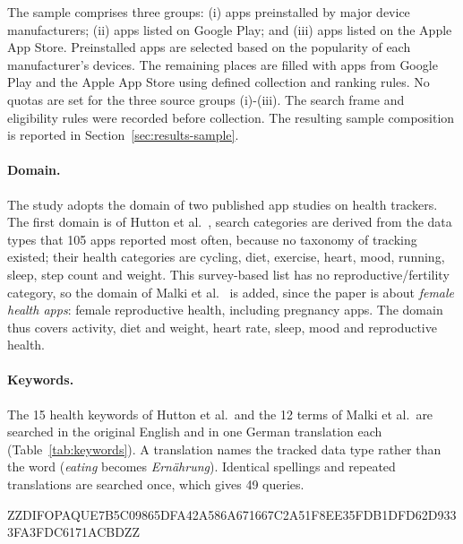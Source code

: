 \documentclass[twoside,its]{bossthesis}
\begin{document}
The sample comprises three groups: \textcolor{accent}{(i)} apps preinstalled
by major device manufacturers; \textcolor{accent}{(ii)} apps listed on
Google Play; and \textcolor{accent}{(iii)} apps listed on the Apple App Store.
Preinstalled apps are selected based on the popularity of each manufacturer's
devices. The remaining places are filled with apps from Google Play and the
Apple App Store using defined collection and ranking rules. No quotas are set for the three source groups \textcolor{accent}{(i)}-\textcolor{accent}{(iii)}. The search frame and eligibility rules were
recorded before collection. The resulting sample composition is reported
in Section~\ref{sec:results-sample}.

\paragraph{Domain.} The study adopts the domain of two published app studies
on health trackers. The first domain is of Hutton et
al.~\parencite{hutton2018assessing}, search categories are derived from the
data types that 105 apps reported most often, because no taxonomy of tracking existed; their health categories are cycling, diet,
exercise, heart, mood, running, sleep, step count and weight. This
survey-based list has no reproductive/fertility category, so the domain of Malki et
al.~\parencite{malki2024exploring} is added, since the paper is about \emph{female health apps}: female reproductive health,
including pregnancy apps. The domain thus covers activity, diet and weight,
heart rate, sleep, mood and reproductive health.

\paragraph{Keywords.} The 15 health keywords of Hutton et al.\ and the 12
terms of Malki et al.\ are searched in the original English and in one German
translation each (Table~\ref{tab:keywords}). A translation names the tracked
data type rather than the word (\emph{eating} becomes \emph{Ernährung}).
Identical spellings and repeated translations are searched once, which gives
49 queries.



ZZDIFOPAQUE7B5C09865DFA42A586A671667C2A51F8EE35FDB1DFD62D9333FA3FDC6171ACBDZZ
\end{document}
